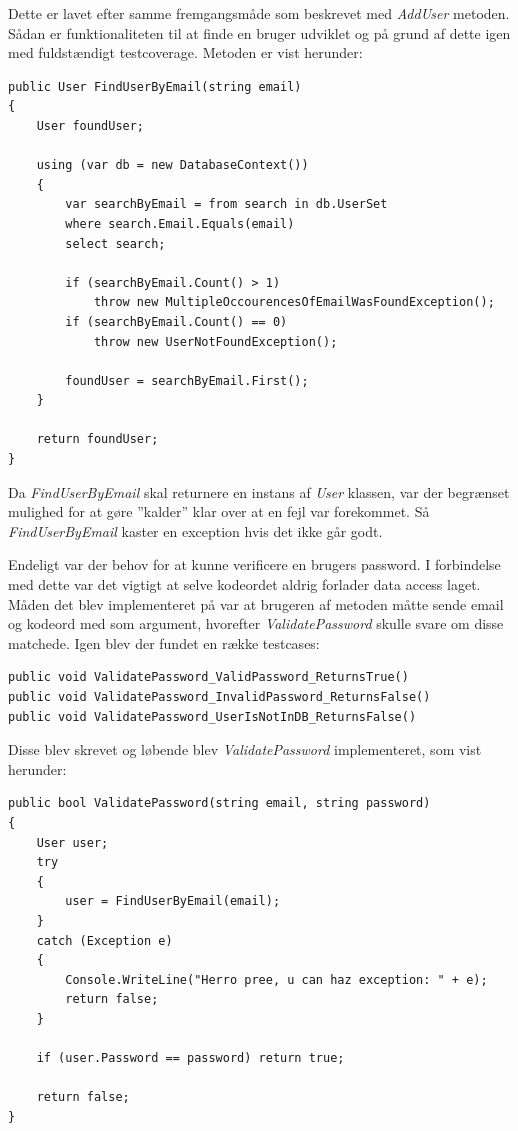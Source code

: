 Dette er lavet efter samme fremgangsmåde som beskrevet med \textit{AddUser} metoden. Sådan er funktionaliteten til at finde en bruger udviklet og på grund af dette igen med fuldstændigt testcoverage. Metoden er vist herunder: 

\begin{lstlisting}
public User FindUserByEmail(string email)
{
	User foundUser;
	
	using (var db = new DatabaseContext())
	{
		var searchByEmail = from search in db.UserSet
		where search.Email.Equals(email)
		select search;
	
		if (searchByEmail.Count() > 1) 
			throw new MultipleOccourencesOfEmailWasFoundException();
		if (searchByEmail.Count() == 0) 
			throw new UserNotFoundException();
	
		foundUser = searchByEmail.First();
	}
	
	return foundUser;
}
\end{lstlisting}

Da \textit{FindUserByEmail} skal returnere en instans af \textit{User} klassen, var der begrænset mulighed for at gøre ''kalder'' klar over at en fejl var forekommet. Så \textit{FindUserByEmail} kaster en exception hvis det ikke går godt.

Endeligt var der behov for at kunne verificere en brugers password. I forbindelse med dette var det vigtigt at selve kodeordet aldrig forlader data access laget. Måden det blev implementeret på var at brugeren af metoden måtte sende email og kodeord med som argument, hvorefter \textit{ValidatePassword} skulle svare om disse matchede. Igen blev der fundet en række testcases:

\begin{lstlisting}[caption=Testcases til \textit{ValidatePassword} metoden.,label=code:validatepasswordtestcases]
public void ValidatePassword_ValidPassword_ReturnsTrue()
public void ValidatePassword_InvalidPassword_ReturnsFalse()
public void ValidatePassword_UserIsNotInDB_ReturnsFalse()
\end{lstlisting}

Disse blev skrevet og løbende blev \textit{ValidatePassword} implementeret, som vist herunder:

\begin{lstlisting}
public bool ValidatePassword(string email, string password)
{
	User user;
	try
	{
		user = FindUserByEmail(email);
	}
	catch (Exception e)
	{
		Console.WriteLine("Herro pree, u can haz exception: " + e);
		return false;
	}
	
	if (user.Password == password) return true;
	
	return false;
}
\end{lstlisting}

